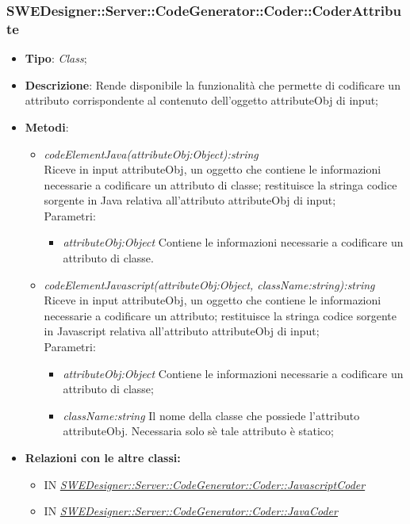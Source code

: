 \documentclass[../DefinizioneDiProdotto.tex]{subfiles}
\begin{document}
			
			\subsubsection{SWEDesigner::Server::CodeGenerator::Coder::CoderAttribute}
			\hypertarget{SWEDesigner::Server::CodeGenerator::Coder::CoderAttribute}{}
			\begin{itemize}
				\item \textbf{Tipo}: \emph{Class};
				\item \textbf{Descrizione}: Rende disponibile la funzionalità che permette di codificare un attributo corrispondente al contenuto dell'oggetto attributeObj di input;\\
				\item \textbf{Metodi}:
				\begin{itemize}
					\item \emph{codeElementJava(attributeObj:Object):string} \\ 
					Riceve in input attributeObj, un oggetto che contiene le informazioni necessarie a codificare un attributo di classe; 
					restituisce la stringa codice sorgente in Java relativa all'attributo attributeObj di input; \\
					Parametri:
					\begin{itemize}
						\item \emph{attributeObj:Object} Contiene le informazioni necessarie a codificare un attributo di classe.
					\end{itemize}
					
					
					
					\item \emph{codeElementJavascript(attributeObj:Object, className:string):string} \\ 
					Riceve in input attributeObj, un oggetto che contiene le informazioni necessarie a codificare un attributo; 
					restituisce la stringa codice sorgente in Javascript relativa all'attributo attributeObj di input; \\
					Parametri:
					\begin{itemize}
						\item \emph{attributeObj:Object} Contiene le informazioni necessarie a codificare un attributo di classe;
						\item \emph{className:string} Il nome della classe che possiede l'attributo attributeObj. Necessaria solo sè tale attributo è statico;
					\end{itemize}
				\end{itemize}
				
				\item \textbf{Relazioni con le altre classi:}
				\begin{itemize}
					\item IN \hyperlink{SWEDesigner::Server::CodeGenerator::Coder::JavascriptCoder}{\emph{SWEDesigner::Server::CodeGenerator::Coder::JavascriptCoder}}
					\item IN \hyperlink{SWEDesigner::Server::CodeGenerator::Coder::JavaCoder}{\emph{SWEDesigner::Server::CodeGenerator::Coder::JavaCoder}}
				\end{itemize}	
			\end{itemize}
			
\end{document}
